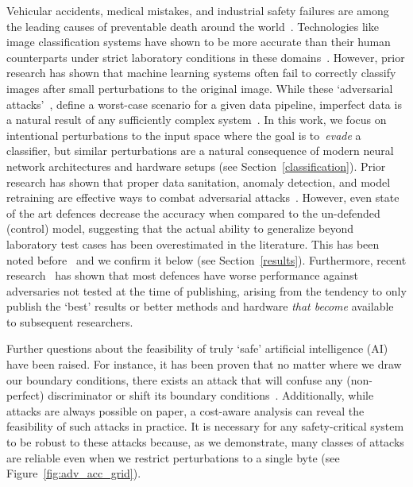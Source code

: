 \documentclass[journal]{IEEEtran}
\begin{document}
Vehicular accidents, medical mistakes, and industrial safety failures are among the leading causes of preventable death around the world~\cite{OECD,makary2016medical,icoh}.
Technologies like image classification systems have shown to be more accurate than their human counterparts under strict laboratory conditions in these domains~\cite{nhtsa,pakdemirli2019artificial,bernal2017safety++}.
However, prior research has shown that machine learning systems often fail to correctly classify images after small perturbations to the original image.
While these `adversarial attacks'~\cite{chakraborty_adversarial_2018,biggio_evasion_2013-1}, define a worst-case scenario for a given data pipeline, imperfect data is a natural result of any sufficiently complex system~\cite{pearson2005mining}.
In this work, we focus on intentional perturbations to the input space where the goal is to~\emph{evade} a classifier, but similar perturbations are a natural consequence of modern neural network architectures and hardware setups (see Section~\ref{classification}).
Prior research has shown that proper data sanitation, anomaly detection, and model retraining are effective ways to combat adversarial attacks~\cite{chakraborty_adversarial_2018,grigorescu2020survey,li_general_2016,wang_security_2019}.
However, even state of the art defences decrease the accuracy when compared to the un-defended (control) model, suggesting that the actual ability to generalize beyond laboratory test cases has been overestimated in the literature.
This has been noted before~\cite{biggio_evasion_2013,carlini_towards_2017,wang_security_2019,li_general_2016} and we confirm it below (see Section~\ref{results}).
Furthermore, recent research~\cite{croce_reliable_2020} has shown that most defences have worse performance against adversaries not tested at the time of publishing, arising from the tendency to only publish the `best' results or better methods and hardware \textit{that become} available to subsequent researchers.

Further questions about the feasibility of truly `safe' artificial intelligence (AI) have been raised.
For instance, it has been proven that no matter where we draw our boundary conditions, there exists an attack that will confuse any (non-perfect) discriminator or shift its boundary conditions~\cite{dohmatob_generalized_2019}.
Additionally, while attacks are always possible on paper, a cost-aware analysis can reveal the feasibility of such attacks in practice.
It is necessary for any safety-critical system to be robust to these attacks because, as we demonstrate, many classes of attacks are reliable even when we restrict perturbations to a single byte (see Figure~\ref{fig:adv_acc_grid}).
\end{document}
